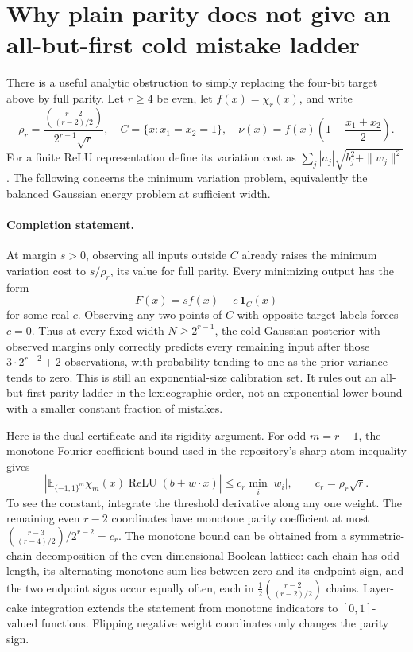 \documentclass[11pt]{article}
\newcommand{\relu}{\operatorname{ReLU}}
\newcommand{\E}{\mathbb E}
\begin{document}
\section{Why plain parity does not give an all-but-first cold mistake ladder}
There is a useful analytic obstruction to simply replacing the four-bit
target above by full parity. Let $r\ge4$ be even, let
$f(x)=\chi_r(x)$, and write
\[
 \rho_r=\frac{\binom{r-2}{(r-2)/2}}{2^{r-1}\sqrt r},
 \quad C=\{x:x_1=x_2=1\},\quad
 \nu(x)=f(x)\left(1-\frac{x_1+x_2}{2}\right).
\]
For a finite ReLU representation define its variation cost as
$\sum_j|a_j|\sqrt{b_j^2+\|w_j\|^2}$. The following concerns the
minimum variation problem, equivalently the balanced Gaussian energy
problem at sufficient width.

\paragraph{Completion statement.}
At margin $s>0$, observing all inputs outside $C$ already raises the
minimum variation cost to $s/\rho_r$, its value for full parity.
Every minimizing output has the form
\[
                  F(x)=sf(x)+c\,\mathbf1_C(x)               \tag{6}
\]
for some real $c$. Observing any two points of $C$ with opposite target
labels forces $c=0$. Thus at every fixed width $N\ge2^{r-1}$, the cold
Gaussian posterior with observed margins only correctly predicts every
remaining input after those $3\cdot2^{r-2}+2$ observations, with
probability tending to one as the prior variance tends to zero.
This is still an exponential-size calibration set. It rules out an
all-but-first parity ladder in the lexicographic order, not an
exponential lower bound with a smaller constant fraction of mistakes.

Here is the dual certificate and its rigidity argument. For odd
$m=r-1$, the monotone Fourier-coefficient bound used in the repository's
sharp atom inequality gives
\[
 \left|\E_{\{-1,1\}^m}\chi_m(x)\relu(b+w\cdot x)\right|
       \le c_r\min_i|w_i|,\qquad c_r=\rho_r\sqrt r.        \tag{7}
\]
To see the constant, integrate the threshold derivative along any one
weight. The remaining even $r-2$ coordinates have monotone parity
coefficient at most
$\binom{r-3}{(r-4)/2}/2^{r-2}=c_r$.
The monotone bound can be obtained from a symmetric-chain decomposition
of the even-dimensional Boolean lattice: each chain has odd length,
its alternating monotone sum lies between zero and its endpoint sign,
and the two endpoint signs occur equally often, each in
$\tfrac12\binom{r-2}{(r-2)/2}$ chains. Layer-cake integration extends
the statement from monotone indicators to $[0,1]$-valued functions.
Flipping negative weight coordinates only changes the parity sign.
\end{document}

